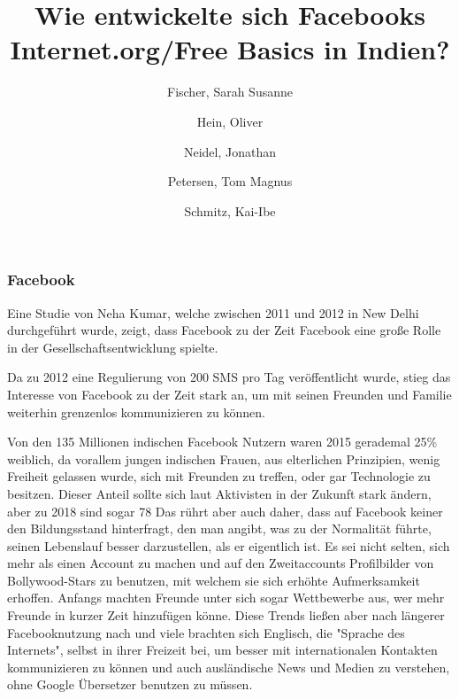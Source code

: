 \documentclass{article}
\title{Wie entwickelte sich Facebooks Internet.org/Free Basics in Indien?}
\author{
  Fischer, Sarah Susanne\\
  \and
  Hein, Oliver\\
  \and
  Neidel, Jonathan\\
  \and
  Petersen, Tom Magnus\\
  \and
  Schmitz, Kai-Ibe\\
}
\begin{document}
\maketitle
\subsubsection {Facebook}
Eine Studie von Neha Kumar, welche zwischen 2011 und 2012 in New Delhi durchgeführt wurde, zeigt, dass Facebook zu der Zeit Facebook eine große Rolle in der Gesellschaftsentwicklung spielte. 

Da zu 2012 eine Regulierung von 200 SMS pro Tag veröffentlicht wurde, stieg das Interesse von Facebook zu der Zeit stark an,
um mit seinen Freunden und Familie weiterhin grenzenlos kommunizieren zu können. 
 
Von den 135 Millionen indischen Facebook Nutzern waren 2015 gerademal 25\% weiblich, da vorallem jungen indischen Frauen, aus elterlichen Prinzipien, 
wenig Freiheit gelassen wurde, sich mit Freunden zu treffen, oder gar Technologie
zu besitzen. Dieser Anteil sollte sich laut Aktivisten in der Zukunft stark ändern, aber zu 2018 sind sogar 78%
Das rührt aber auch daher, dass auf Facebook keiner den Bildungsstand hinterfragt, den man angibt, was zu der Normalität führte, seinen Lebenslauf besser darzustellen,
als er eigentlich ist. Es sei nicht selten, sich mehr als einen Account zu machen und auf den Zweitaccounts Profilbilder
von Bollywood-Stars zu benutzen, mit welchem sie sich erhöhte Aufmerksamkeit erhoffen.
Anfangs machten Freunde unter sich sogar Wettbewerbe aus, wer mehr Freunde in kurzer Zeit hinzufügen könne.
Diese Trends ließen aber nach längerer Facebooknutzung nach und viele brachten sich Englisch, die "Sprache des Internets", 
selbst in ihrer Freizeit bei, um besser mit internationalen Kontakten
kommunizieren zu können und auch ausländische News und Medien zu verstehen, ohne Google Übersetzer benutzen zu müssen. 


\end{document}
